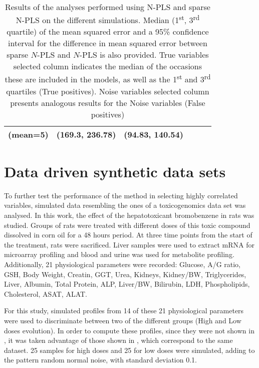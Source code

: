 \begin{table}[hbtp]
{\begin{tabular}{@{}lccccc@{}}
(mean=5)             & (169.3, 236.78)  & (94.83, 140.54) &                                                                           &                                                                            &                                                                             \\ \bottomrule
\end{tabular}%
}
\caption[Results of the analyses performed using $N$-PLS and sparse $N$-PLS on the different synthetic simulations]{Results of the analyses performed using N-PLS and sparse N-PLS on the different simulations. Median (1\textsuperscript{st}, 3\textsuperscript{rd} quartile) of the mean squared error and a 95\% confidence interval for the difference in mean squared error between sparse $N$-PLS and $N$-PLS is also provided. True variables selected column indicates the median of the occasions these are included in the models, as well as the 1\textsuperscript{st} and 3\textsuperscript{rd} quartiles (True positives). Noise variables selected column presents analogous results for the Noise variables (False positives)}
\label{table:results_synthetic}
\end{table}

\section{Data driven synthetic data sets}
To further test the performance of the method in selecting highly correlated variables, simulated data resembling the ones of a  toxicogenomics data set \parencite{heijne2004bromobenzene} was analysed. In this work, the effect of the hepatotoxicant bromobenzene in rats was studied. Groups of rats were treated with different doses of this toxic compound dissolved in corn oil for a 48 hours period. At three time points from the start of the treatment, rats were sacrificed. Liver samples were used to extract mRNA for microarray profiling and blood and urine was used for metabolite profiling. Additionally, 21 physiological parameters were recorded: Glucose, A/G ratio, GSH, Body Weight, Creatin, GGT, Urea, Kidneys, Kidney/BW, Triglycerides, Liver, Albumin, Total Protein, ALP, Liver/BW, Bilirubin, LDH, Phospholipids, Cholesterol, ASAT, ALAT. 

For this study, simulated profiles from 14 of these 21 physiological parameters were used to discriminate between two of the different groups (High and Low doses evolution). In order to compute these profiles, since they were not shown in \parencite{heijne2004bromobenzene}, it was taken advantage of those shown in \cite{conesa2010multiway}, which correspond to the same dataset. 25 samples for high doses and 25 for low doses were simulated, adding to the pattern random normal noise, with standard deviation 0.1.

